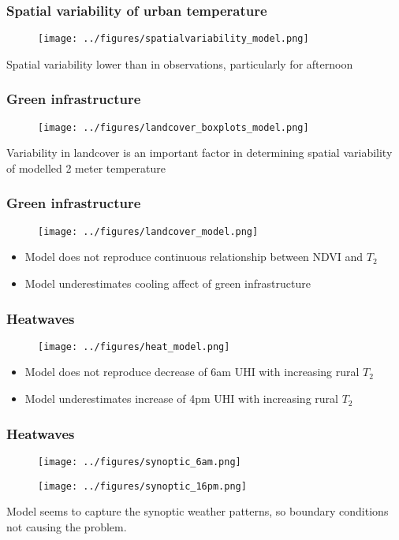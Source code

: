 \documentclass[aspectratio=169, 10pt]{beamer}
\begin{document}
\begin{frame}
\frametitle{Spatial variability of urban temperature}
\begin{figure}
\texttt{[image: ../figures/spatialvariability\_model.png]}
\end{figure}
Spatial variability lower than in observations, particularly for afternoon
\end{frame}

\begin{frame}
\frametitle{Green infrastructure}
\begin{figure}
\texttt{[image: ../figures/landcover\_boxplots\_model.png]}
\end{figure}
Variability in landcover is an important factor in determining spatial variability of modelled 2 meter temperature
\end{frame}

\begin{frame}
\frametitle{Green infrastructure}
\begin{figure}
\texttt{[image: ../figures/landcover\_model.png]}
\end{figure}
\begin{itemize}
\item Model does not reproduce continuous relationship between NDVI and $T_2$
\item Model underestimates cooling affect of green infrastructure

\end{itemize}
\end{frame}

\begin{frame}
\frametitle{Heatwaves}
\begin{figure}
\texttt{[image: ../figures/heat\_model.png]}
\end{figure}
\begin{itemize}
\item Model does not reproduce decrease of 6am UHI with increasing rural $T_2$
\item Model underestimates increase of 4pm UHI with increasing rural $T_2$
\end{itemize}
\end{frame}


\begin{frame}
\frametitle{Heatwaves}
\begin{figure}
\texttt{[image: ../figures/synoptic\_6am.png]}

\texttt{[image: ../figures/synoptic\_16pm.png]}
\end{figure}
Model seems to capture the synoptic weather patterns, so boundary conditions not causing the problem. 
\end{frame}
\end{document}
